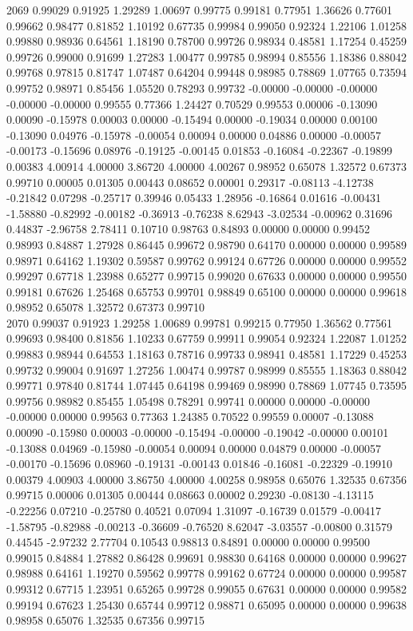 {2069 0.99029 0.91925 1.29289 1.00697 0.99775 0.99181 0.77951 1.36626 0.77601 0.99662 0.98477 0.81852 1.10192 0.67735 0.99984 0.99050 0.92324 1.22106 1.01258 0.99880 0.98936 0.64561 1.18190 0.78700 0.99726 0.98934 0.48581 1.17254 0.45259 0.99726 0.99000 0.91699 1.27283 1.00477 0.99785 0.98994 0.85556 1.18386 0.88042 0.99768 0.97815 0.81747 1.07487 0.64204 0.99448 0.98985 0.78869 1.07765 0.73594 0.99752 0.98971 0.85456 1.05520 0.78293 0.99732 -0.00000 -0.00000 -0.00000 -0.00000 -0.00000 0.99555 0.77366 1.24427 0.70529 0.99553 0.00006 -0.13090 0.00090 -0.15978 0.00003 0.00000 -0.15494 0.00000 -0.19034 0.00000 0.00100 -0.13090 0.04976 -0.15978 -0.00054 0.00094 0.00000 0.04886 0.00000 -0.00057 -0.00173 -0.15696 0.08976 -0.19125 -0.00145 0.01853 -0.16084 -0.22367 -0.19899 0.00383 4.00914 4.00000 3.86720 4.00000 4.00267 0.98952 0.65078 1.32572 0.67373 0.99710 0.00005 0.01305 0.00443 0.08652 0.00001 0.29317 -0.08113 -4.12738 -0.21842 0.07298 -0.25717 0.39946 0.05433 1.28956 -0.16864 0.01616 -0.00431 -1.58880 -0.82992 -0.00182 -0.36913 -0.76238 8.62943 -3.02534 -0.00962 0.31696 0.44837 -2.96758 2.78411 0.10710 0.98763 0.84893 0.00000 0.00000 0.99452 0.98993 0.84887 1.27928 0.86445 0.99672 0.98790 0.64170 0.00000 0.00000 0.99589 0.98971 0.64162 1.19302 0.59587 0.99762 0.99124 0.67726 0.00000 0.00000 0.99552 0.99297 0.67718 1.23988 0.65277 0.99715 0.99020 0.67633 0.00000 0.00000 0.99550 0.99181 0.67626 1.25468 0.65753 0.99701 0.98849 0.65100 0.00000 0.00000 0.99618 0.98952 0.65078 1.32572 0.67373 0.99710 \\
2070 0.99037 0.91923 1.29258 1.00689 0.99781 0.99215 0.77950 1.36562 0.77561 0.99693 0.98400 0.81856 1.10233 0.67759 0.99911 0.99054 0.92324 1.22087 1.01252 0.99883 0.98944 0.64553 1.18163 0.78716 0.99733 0.98941 0.48581 1.17229 0.45253 0.99732 0.99004 0.91697 1.27256 1.00474 0.99787 0.98999 0.85555 1.18363 0.88042 0.99771 0.97840 0.81744 1.07445 0.64198 0.99469 0.98990 0.78869 1.07745 0.73595 0.99756 0.98982 0.85455 1.05498 0.78291 0.99741 0.00000 0.00000 -0.00000 -0.00000 0.00000 0.99563 0.77363 1.24385 0.70522 0.99559 0.00007 -0.13088 0.00090 -0.15980 0.00003 -0.00000 -0.15494 -0.00000 -0.19042 -0.00000 0.00101 -0.13088 0.04969 -0.15980 -0.00054 0.00094 0.00000 0.04879 0.00000 -0.00057 -0.00170 -0.15696 0.08960 -0.19131 -0.00143 0.01846 -0.16081 -0.22329 -0.19910 0.00379 4.00903 4.00000 3.86750 4.00000 4.00258 0.98958 0.65076 1.32535 0.67356 0.99715 0.00006 0.01305 0.00444 0.08663 0.00002 0.29230 -0.08130 -4.13115 -0.22256 0.07210 -0.25780 0.40521 0.07094 1.31097 -0.16739 0.01579 -0.00417 -1.58795 -0.82988 -0.00213 -0.36609 -0.76520 8.62047 -3.03557 -0.00800 0.31579 0.44545 -2.97232 2.77704 0.10543 0.98813 0.84891 0.00000 0.00000 0.99500 0.99015 0.84884 1.27882 0.86428 0.99691 0.98830 0.64168 0.00000 0.00000 0.99627 0.98988 0.64161 1.19270 0.59562 0.99778 0.99162 0.67724 0.00000 0.00000 0.99587 0.99312 0.67715 1.23951 0.65265 0.99728 0.99055 0.67631 0.00000 0.00000 0.99582 0.99194 0.67623 1.25430 0.65744 0.99712 0.98871 0.65095 0.00000 0.00000 0.99638 0.98958 0.65076 1.32535 0.67356 0.99715 \\
}

